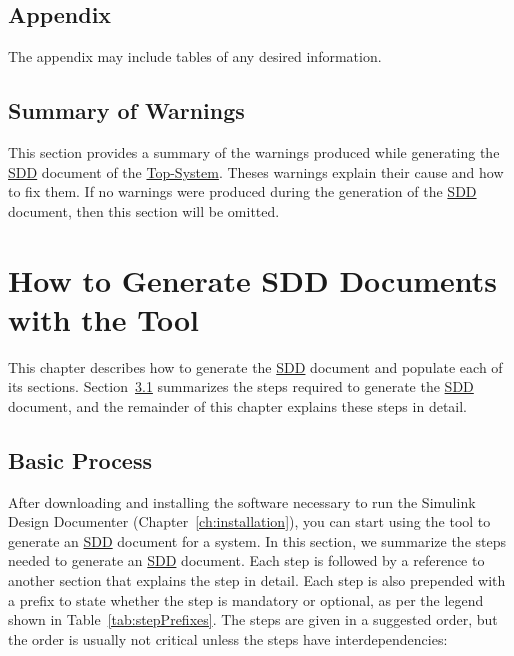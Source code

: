 \documentclass{mcscert}
\newcommand{\sddtool}{Simulink Design Documenter}
\newcommand{\topsystemnolink}{Top-System} %
\newcommand{\topsystem}{\hyperref[def:topsystem]{\topsystemnolink{}}}
\begin{document}
\section{Appendix} 
\label{sec:app-description}
The appendix may include tables of any desired information. 

\section{Summary of Warnings} 
\label{sec:summ-warnings}
This section provides a summary of the warnings produced while generating the \hyperref[acr:sdd]{SDD} document of the \topsystem{}. 
Theses warnings explain their cause  and how to fix them. 
If no warnings were produced during the generation of the \hyperref[acr:sdd]{SDD} document, then this section will be omitted.

\chapter{How to Generate SDD Documents with the Tool}
\label{ch:doc-process}
This chapter describes how to generate the \hyperref[acr:sdd]{SDD} document and populate each of its sections. 
Section~\ref{sec:basic-proc} summarizes the steps required to generate the \hyperref[acr:sdd]{SDD} document, and the remainder of this chapter explains these steps in detail.

\section{Basic Process}
\label{sec:basic-proc}

After downloading and installing the software necessary to run the \sddtool{} (Chapter~\ref{ch:installation}), you can start using the tool to generate an \hyperref[acr:sdd]{SDD} document for a \simulink{} system. 
In this section, we summarize the steps needed to generate an \hyperref[acr:sdd]{SDD} document. 
Each step is followed by a reference to another section that explains the step in detail. 
Each step is also prepended with a prefix to state whether the step is mandatory or optional, as per the legend shown in Table~\ref{tab:stepPrefixes}. 
The steps are given in a suggested order, but the order is usually not critical unless the steps have interdependencies:
\end{document}
